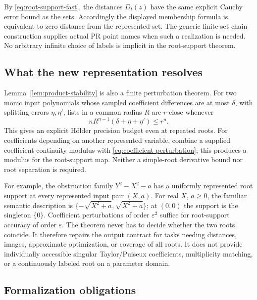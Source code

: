 By \eqref{eq:root-support-fast}, the distances \(D_t(z)\) have the
same explicit Cauchy error bound as the sets. Accordingly the displayed
membership formula is equivalent to zero distance from the represented
set. The generic finite-set chain construction supplies actual PR point
names when such a realization is needed. No arbitrary infinite choice
of labels is implicit in the root-support theorem.

\subsection{What the new representation resolves}

Lemma~\ref{lem:product-stability} is also a finite perturbation theorem.
For two monic input polynomials whose sampled coefficient differences
are at most \(\delta\), with splitting errors \(\eta,\eta'\), lists
in a common radius \(R\) are \(r\)-close whenever
\[
 nR^{n-1}(\delta+\eta+\eta')\le r^n.
 \tag{CP}\label{eq:coefficient-perturbation}
\]
This gives an explicit H\"older precision budget even at repeated roots.
For coefficients depending on another represented variable, combine a
supplied coefficient continuity modulus with
\eqref{eq:coefficient-perturbation}; this produces a modulus for the
root-support map. Neither a simple-root derivative bound nor root
separation is required.

For example, the obstruction family \(Y^2-X^2-a\) has a uniformly
represented root support at every represented input pair \((X,a)\).
For real \(X\), \(a\ge0\), the familiar semantic description is
\(\{-\sqrt{X^2+a},\sqrt{X^2+a}\}\); at \((0,0)\) the support is the
singleton \(\{0\}\). Coefficient perturbations of order \(\varepsilon^2\)
suffice for root-support accuracy of order \(\varepsilon\). The theorem
never has to decide whether the two roots coincide. It therefore repairs
the output contract for tasks needing distances, images, approximate
optimization, or coverage of all roots. It does not provide individually
accessible singular Taylor/Puiseux coefficients, multiplicity matching,
or a continuously labeled root on a parameter domain.

\subsection{Formalization obligations}

